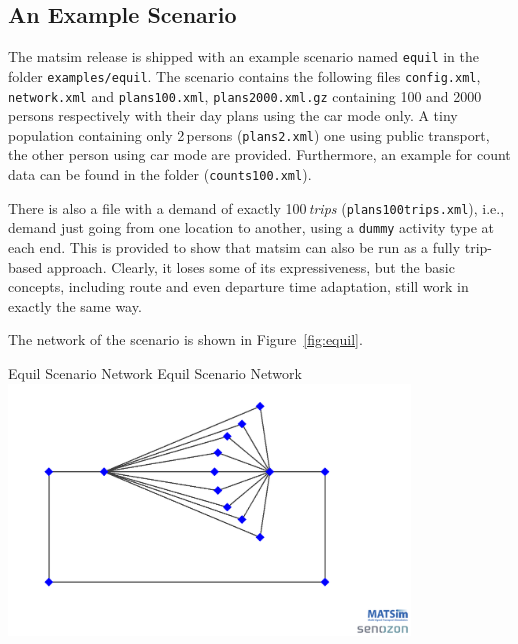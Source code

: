 \subsection{An Example Scenario}
The \gls{matsim} release is shipped with an example scenario named \lstinline|equil| in the folder \lstinline|examples/equil|. The scenario contains the following files \lstinline|config.xml|, \lstinline|network.xml| and \lstinline|plans100.xml|, \lstinline|plans2000.xml.gz| containing 100 and 2000\,persons respectively with their day plans using the car mode only. A tiny population containing only 2\,persons (\lstinline|plans2.xml|) one using public transport, the other person using car mode are provided. Furthermore, an example for count data can be found in the folder (\lstinline|counts100.xml|). 




There is also a file with a demand of exactly 100\,\emph{trips} (\lstinline|plans100trips.xml|), i.e.,\,demand just going from one location to another, using a \lstinline$dummy$ activity type at each end.  This is provided to show that \gls{matsim} can also be run as a fully trip-based approach. Clearly, it loses some of its expressiveness, but the basic concepts, including route and even departure time adaptation, still work in exactly the same way.

The network of the scenario is shown in Figure~\ref{fig:equil}.

\createfigure%
{Equil Scenario Network}%
{Equil Scenario Network}%
{\label{fig:equil}}%
{\includegraphics[width=0.8\textwidth, angle=0]{using/figures/equil.png}}%
{}


